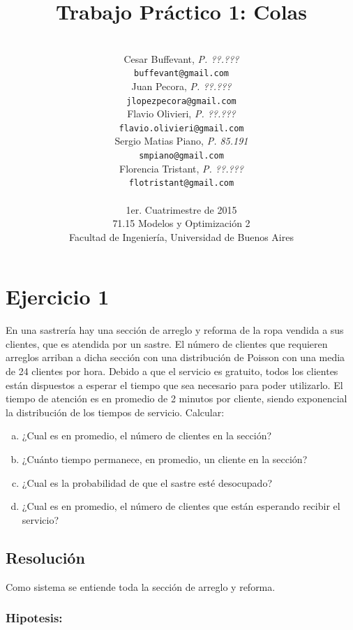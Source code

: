 \documentclass[a4paper,11pt]{article}
\title{\textbf{Trabajo Práctico 1: Colas}}
\author{\\
  Cesar Buffevant, \textit{P. ??.???}                              \\
  \texttt{buffevant@gmail.com}                                     \\ [2.5ex]
  Juan Pecora, \textit{P. ??.???}                                  \\
  \texttt{jlopezpecora@gmail.com}                                  \\ [2.5ex]
  Flavio Olivieri, \textit{P. ??.???}                              \\
  \texttt{flavio.olivieri@gmail.com}                               \\ [2.5ex]
  Sergio Matias Piano, \textit{P. 85.191}                          \\
  \texttt{smpiano@gmail.com}                                       \\ [2.5ex]
  Florencia Tristant, \textit{P. ??.???}                           \\
  \texttt{flotristant@gmail.com}                                   \\ [2.5ex]
                                                                   \\
  \normalsize{1er. Cuatrimestre de 2015}                           \\
  \normalsize{71.15 Modelos y Optimización 2}                      \\
  \normalsize{Facultad de Ingeniería, Universidad de Buenos Aires} \\
}
\date{}
\begin{document}
\thispagestyle{empty}
\maketitle

\clearpage

\vspace{8pt}
\section*{\textbf{Ejercicio 1}}

\baselineskip=13pt
En una sastrería hay una sección de arreglo y reforma de la ropa vendida a sus 
clientes, que es atendida por un sastre. El número de clientes que requieren arreglos 
arriban a dicha sección con una distribución de Poisson con una media de 24 clientes 
por hora. Debido a que el servicio es gratuito, todos los clientes están dispuestos 
a esperar el tiempo que sea necesario para poder utilizarlo. El tiempo de atención 
es en promedio de 2 minutos por cliente, siendo exponencial la distribución de 
los tiempos de servicio. Calcular:

\leftskip=36pt
\parindent=-18pt
\begin{enumerate}[a.]
  \item ¿Cual es en promedio, el número de clientes en la sección?

  \item ¿Cuánto tiempo permanece, en promedio, un cliente en la sección?

  \item ¿Cual es la probabilidad de que el sastre esté desocupado?

  \item ¿Cual es en promedio, el número de clientes que están esperando recibir 
  el servicio?
\end{enumerate}

\vspace{13pt}
\leftskip=0pt
\parindent=0pt
\subsection*{\textbf{Resolución}}

Como sistema se entiende toda la sección de arreglo y reforma.\label{h.ucd2riukxd97}

\vspace{8pt}
\subsubsection*{Hipotesis:}
\end{document}
